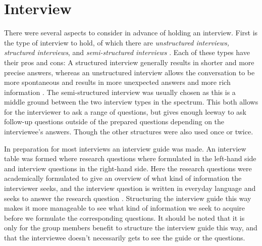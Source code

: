 \chapter{Interview} \label{sec:interview}

There were several aspects to consider in advance of holding an interview.
First is the type of interview to hold, of which there are \textit{unstructured interviews, structured interviews}, and \textit{semi-structured interviews} \citep{interactionhci}.
Each of these types have their pros and cons: A structured interview generally results in shorter and more precise answers, whereas an unstructured interview allows the conversation to be more spontaneous and results in more unexpected answers and more rich information \citep{interview}.
The semi-structured interview was usually chosen as this is a middle ground between the two interview types in the spectrum.
This both allows for the interviewer to ask a range of questions, but gives enough leeway to ask follow-up questions outside of the prepared questions depending on the interviewee’s answers.
Though the other structures were also used once or twice.

In preparation for most interviews an interview guide was made.
An interview table was formed where research questions where formulated in the left-hand side and interview questions in the right-hand side.
Here the research questions were academically formulated to give an overview of what kind of information the interviewer seeks, and the interview question is written in everyday language and seeks to answer the research question \citep{interview}.
Structuring the interview guide this way makes it more manageable to see what kind of information we seek to acquire before we formulate the corresponding questions.
It should be noted that it is only for the group members benefit to structure the interview guide this way, and that the interviewee doesn’t necessarily gets to see the guide or the questions.